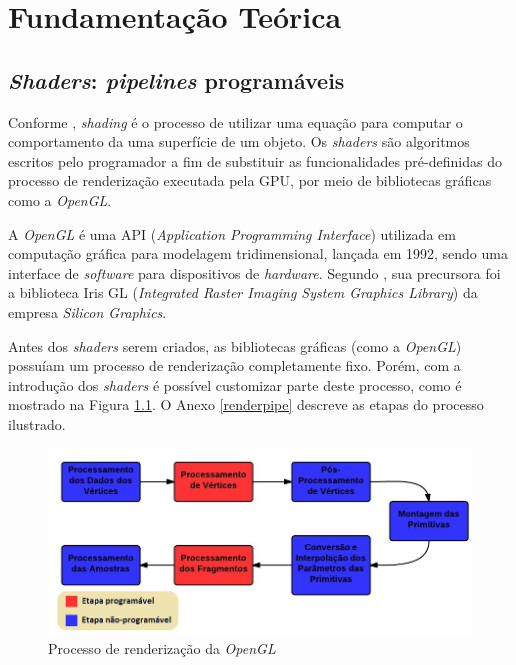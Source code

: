 \chapter[Fundamentação Teórica]{Fundamentação Teórica}
\label{refteorico}

\section{\textit{Shaders}: \textit{pipelines} programáveis}

	Conforme \cite{realtime}, \textit{shading} é o processo de utilizar uma equação para computar o comportamento da uma superfície de um objeto. Os \textit{shaders} são algoritmos escritos pelo programador a fim de substituir as funcionalidades pré-definidas do processo de renderização executada pela GPU, por meio de bibliotecas gráficas como a \textit{OpenGL}.

	 A \textit{OpenGL} é uma API (\textit{Application Programming Interface}) utilizada em computação gráfica para modelagem tridimensional, lançada em 1992, sendo uma interface de \textit{software} para dispositivos de \textit{hardware}. Segundo \cite{opengl2011}, sua precursora foi a biblioteca Iris GL (\textit{Integrated Raster Imaging System Graphics Library}) da empresa \textit{Silicon Graphics}.

	Antes dos \textit{shaders} serem criados, as bibliotecas gráficas (como a \textit{OpenGL}) possuíam um processo de renderização completamente fixo. Porém, com a introdução dos \textit{shaders} é possível customizar parte deste processo, como é  mostrado na Figura \ref{pipeline}. O Anexo \ref{renderpipe} descreve as etapas do processo ilustrado.
	\begin{figure}[ht]
	\centering
		\includegraphics[keepaspectratio=true,scale=0.5]{figuras/pipeline.jpg}
	\caption{Processo de renderização da \textit{OpenGL}}
	\label{pipeline}
	\end{figure}

